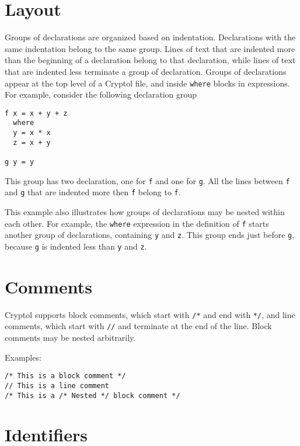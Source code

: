 \section{Layout}\label{layout}

Groups of declarations are organized based on indentation. Declarations
with the same indentation belong to the same group. Lines of text that
are indented more than the beginning of a declaration belong to that
declaration, while lines of text that are indented less terminate a
group of declaration. Groups of declarations appear at the top level of
a Cryptol file, and inside \texttt{where} blocks in expressions. For
example, consider the following declaration group

\begin{verbatim}
f x = x + y + z
  where
  y = x * x
  z = x + y

g y = y
\end{verbatim}

This group has two declaration, one for \texttt{f} and one for
\texttt{g}. All the lines between \texttt{f} and \texttt{g} that are
indented more then \texttt{f} belong to \texttt{f}.

This example also illustrates how groups of declarations may be nested
within each other. For example, the \texttt{where} expression in the
definition of \texttt{f} starts another group of declarations,
containing \texttt{y} and \texttt{z}. This group ends just before
\texttt{g}, because \texttt{g} is indented less than \texttt{y} and
\texttt{z}.

\section{Comments}\label{comments}

Cryptol supports block comments, which start with \texttt{/*} and end
with \texttt{*/}, and line comments, which start with \texttt{//} and
terminate at the end of the line. Block comments may be nested
arbitrarily.

Examples:

\begin{verbatim}
/* This is a block comment */
// This is a line comment
/* This is a /* Nested */ block comment */
\end{verbatim}

\section{Identifiers}\label{identifiers}

